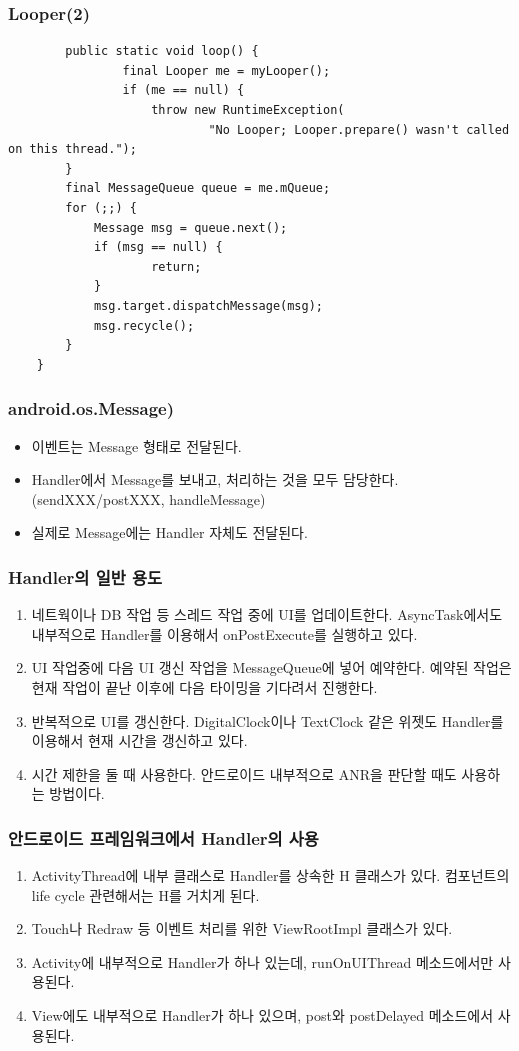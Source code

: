 \documentclass{beamer}
\newcommand\Fontvi{\fontsize{8}{9.6}\selectfont}
\begin{document}
\begin{frame}[fragile]
\frametitle{Looper(2)}
\Fontvi
\begin{verbatim} 
    	public static void loop() {
    	    	final Looper me = myLooper();
    	    	if (me == null) {
	    	    	throw new RuntimeException(
	    	    	    	"No Looper; Looper.prepare() wasn't called on this thread.");
        }
        final MessageQueue queue = me.mQueue;
        for (;;) {
            Message msg = queue.next();
            if (msg == null) {
                	return;
            }
            msg.target.dispatchMessage(msg);
            msg.recycle();
        }
    }
\end{verbatim}
\end{frame}

\begin{frame}
\frametitle{android.os.Message)}
\begin{itemize}
\item 이벤트는 Message 형태로 전달된다.
\item Handler에서 Message를 보내고, 처리하는 것을 모두 담당한다.(sendXXX/postXXX, handleMessage)
\item 실제로 Message에는 Handler 자체도 전달된다.
\end{itemize}
\end{frame}

\begin{frame}
\frametitle{Handler의 일반 용도}
\begin{enumerate}
\item 네트웍이나 DB 작업 등 스레드 작업 중에 UI를 업데이트한다. AsyncTask에서도 내부적으로 Handler를 이용해서 onPostExecute를 실행하고 있다.
\item UI 작업중에 다음 UI 갱신 작업을 MessageQueue에 넣어 예약한다. 예약된 작업은 현재 작업이 끝난 이후에 다음 타이밍을 기다려서 진행한다.
\item 반복적으로 UI를 갱신한다. DigitalClock이나 TextClock 같은 위젯도 Handler를 이용해서 현재 시간을 갱신하고 있다.
\item 시간 제한을 둘 때 사용한다. 안드로이드 내부적으로 ANR을 판단할 때도 사용하는 방법이다.
\end{enumerate}
\end{frame}

\begin{frame}
\frametitle{안드로이드 프레임워크에서 Handler의 사용}
\begin{enumerate}
\item ActivityThread에 내부 클래스로 Handler를 상속한 H 클래스가 있다. 컴포넌트의 life cycle 관련해서는 H를 거치게 된다.
\item Touch나 Redraw 등 이벤트 처리를 위한 ViewRootImpl 클래스가 있다.
\item Activity에 내부적으로 Handler가 하나 있는데, runOnUIThread 메소드에서만 사용된다. 
\item View에도 내부적으로 Handler가 하나 있으며, post와 postDelayed 메소드에서 사용된다.
\end{enumerate}
\end{frame}
\end{document}
